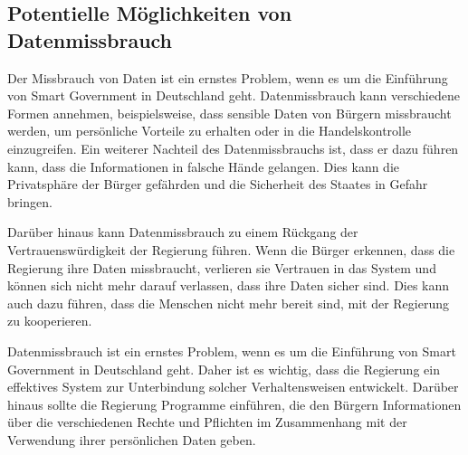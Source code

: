 \subsection{Potentielle Möglichkeiten von Datenmissbrauch}
Der Missbrauch von Daten ist ein ernstes Problem, wenn es um die Einführung von Smart Government in Deutschland geht. 
Datenmissbrauch kann verschiedene Formen annehmen, beispielsweise, dass sensible Daten von Bürgern missbraucht werden, um persönliche Vorteile zu erhalten oder in die Handelskontrolle einzugreifen. 
Ein weiterer Nachteil des Datenmissbrauchs ist, dass er dazu führen kann, dass die Informationen in falsche Hände gelangen. 
Dies kann die Privatsphäre der Bürger gefährden und die Sicherheit des Staates in Gefahr bringen.
\par
Darüber hinaus kann Datenmissbrauch zu einem Rückgang der Vertrauenswürdigkeit der Regierung führen. 
Wenn die Bürger erkennen, dass die Regierung ihre Daten missbraucht, verlieren sie Vertrauen in das System und können sich nicht mehr darauf verlassen, dass ihre Daten sicher sind. 
Dies kann auch dazu führen, dass die Menschen nicht mehr bereit sind, mit der Regierung zu kooperieren.
\par
Datenmissbrauch ist ein ernstes Problem, wenn es um die Einführung von Smart Government in Deutschland geht. 
Daher ist es wichtig, dass die Regierung ein effektives System zur Unterbindung solcher Verhaltensweisen entwickelt. 
Darüber hinaus sollte die Regierung Programme einführen, die den Bürgern Informationen über die verschiedenen Rechte und Pflichten im Zusammenhang mit der Verwendung ihrer persönlichen Daten geben.